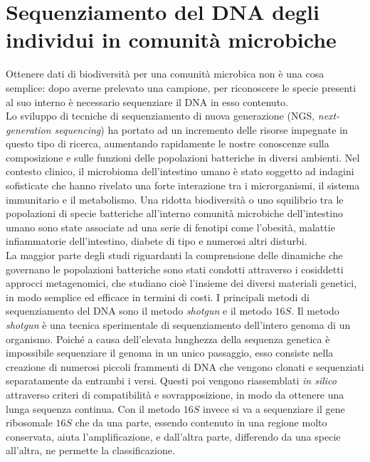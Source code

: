 \section{Sequenziamento del DNA degli individui in comunità microbiche}
Ottenere dati di biodiversità per una comunità microbica non è una cosa semplice: dopo averne prelevato una campione, per riconoscere le specie presenti al suo interno è necessario sequenziare il DNA in esso contenuto.\\
Lo sviluppo di tecniche di sequenziamento di nuova generazione (NGS, \emph{next-generation sequencing}) ha portato ad un incremento delle risorse impegnate in questo tipo di ricerca, aumentando rapidamente le nostre conoscenze sulla composizione e sulle funzioni delle popolazioni batteriche in diversi ambienti\cite{shotgun}. Nel contesto clinico, il microbioma dell'intestino umano è stato soggetto ad indagini sofisticate che hanno rivelato una forte interazione tra i microrganismi, il sistema immunitario e il metabolismo. Una ridotta biodiversità o uno squilibrio tra le popolazioni di specie batteriche all'interno comunità microbiche dell'intestino umano sono state associate ad una serie di fenotipi come l'obesità, malattie infiammatorie dell'intestino, diabete di tipo  e numerosi altri disturbi.\\
La maggior parte degli studi riguardanti la comprensione delle dinamiche che governano le popolazioni batteriche sono stati condotti attraverso i cosiddetti approcci metagenomici, che studiano cioè l'insieme dei diversi materiali genetici, in modo semplice ed efficace in termini di costi. I principali metodi di sequenziamento del DNA sono il metodo \emph{shotgun} e il metodo $16S$.
Il metodo \emph{shotgun} è una tecnica sperimentale di sequenziamento dell'intero genoma di un organismo\cite{HEATHER20161}. Poiché a causa dell'elevata lunghezza della sequenza genetica è impossibile sequenziare il genoma in un unico passaggio, esso consiste nella creazione di numerosi piccoli frammenti di DNA che vengono clonati e sequenziati separatamente da entrambi i versi. Questi poi vengono riassemblati \emph{in silico} attraverso criteri di compatibilità e sovrapposizione, in modo da ottenere una lunga sequenza continua. Con il metodo $16S$ invece si va a sequenziare il gene ribosomale $16S$ che da una parte, essendo contenuto in una regione molto conservata, aiuta l'amplificazione, e dall'altra parte, differendo da una specie all'altra, ne permette la classificazione.\\
